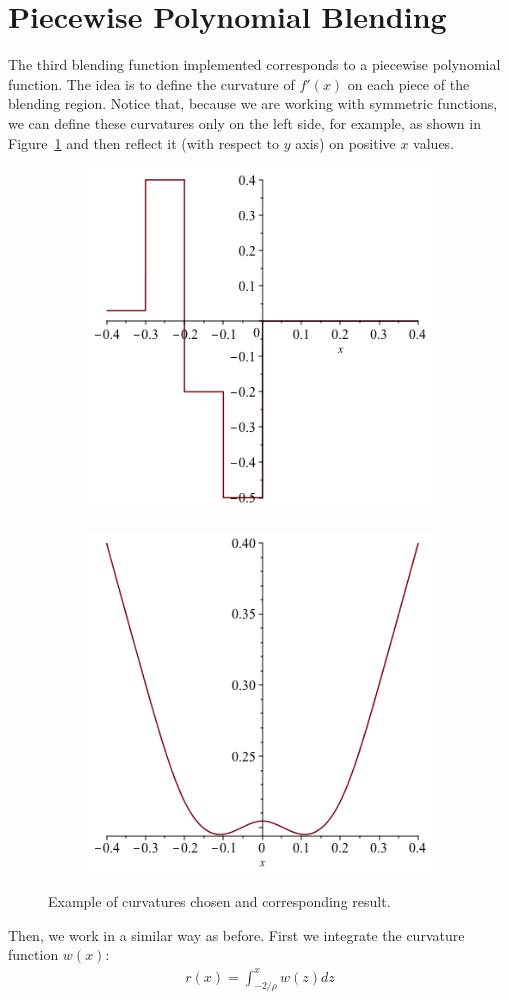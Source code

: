 \documentclass[11pt]{article}
\begin{document}
\section{Piecewise Polynomial Blending}
The third blending function implemented corresponds to a piecewise polynomial function. The idea is to define the curvature of $f'(x)$ on each piece of the blending region. Notice that, because we are working with symmetric functions, we can define these curvatures only on the left side, for example, as shown in Figure~\ref{fig:curvatures} and then reflect it (with respect to $y$ axis) on positive $x$ values.
  \begin{figure}[!hbt]
    \centering
    \begin{subfigure}
      \centering
      \includegraphics[width=0.4\linewidth]{curvatures}
    \end{subfigure}%
    \begin{subfigure}
      \centering
      \includegraphics[width=.4\linewidth]{curvatures_result}
    \end{subfigure}
    \caption{Example of curvatures chosen and corresponding result.}
    \label{fig:curvatures}
  \end{figure}

Then, we work in a similar way as before. First we integrate the curvature function $w(x)$:
\begin{align*}
  r(x) = \int_{-2/\rho}^{x} w(z) dz
\end{align*}
\end{document}
